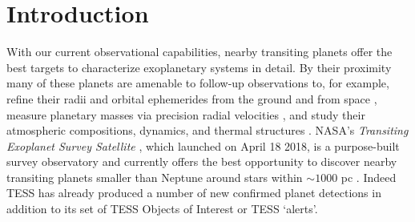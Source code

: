 


\section{Introduction}
With our current observational capabilities, nearby transiting planets offer the best targets
to characterize exoplanetary systems in detail. By their proximity many of
these planets are amenable to follow-up observations to, for example, refine their radii and orbital
ephemerides from the ground \citep{stefansson17,cooke18} and from space \citep{broeg13,gaidos17},
measure planetary masses via precision radial velocities \citep{cloutier18b}, and study
their atmospheric compositions, dynamics, and thermal structures \citep{louie18,kempton18}. NASA's
\emph{Transiting Exoplanet Survey Satellite} \citep[TESS;][]{ricker15}, which launched on April 18
2018, is a purpose-built survey observatory and currently offers the best opportunity to discover
nearby transiting planets smaller than Neptune around stars within $\sim 1000$ pc \citep{stassun17}.
Indeed TESS has already produced a number of new confirmed planet detections
\citep{esposito18,gandolfi18,huang18a,trifonov18,vanderspek18} %
in addition to its set of TESS Objects of Interest or TESS `alerts'. \\

